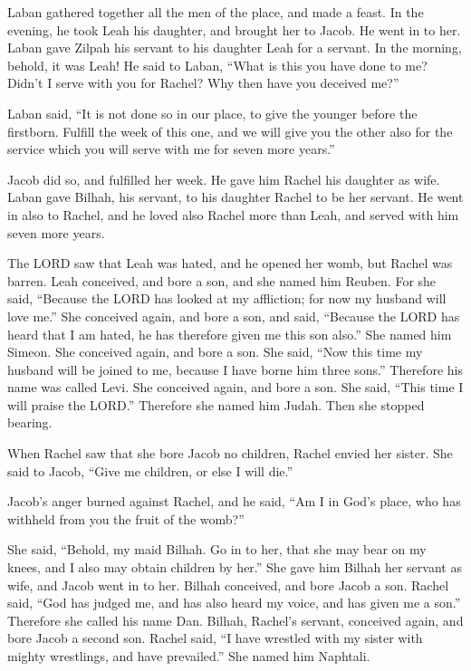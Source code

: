 \myverse{}Laban gathered together all the men of the place, and made a feast.  \myverse{}In the evening, he took Leah his daughter, and brought her to Jacob. He went in to her.  \myverse{}Laban gave Zilpah his servant to his daughter Leah for a servant.  \myverse{}In the morning, behold, it was Leah! He said to Laban, “What is this you have done to me? Didn’t I serve with you for Rachel? Why then have you deceived me?”

\myverse{}Laban said, “It is not done so in our place, to give the younger before the firstborn.  \myverse{}Fulfill the week of this one, and we will give you the other also for the service which you will serve with me for seven more years.”

\myverse{}Jacob did so, and fulfilled her week. He gave him Rachel his daughter as wife.  \myverse{}Laban gave Bilhah, his servant, to his daughter Rachel to be her servant.  \myverse{}He went in also to Rachel, and he loved also Rachel more than Leah, and served with him seven more years.

\myverse{}The LORD saw that Leah was hated, and he opened her womb, but Rachel was barren.  \myverse{}Leah conceived, and bore a son, and she named him Reuben. For she said, “Because the LORD has looked at my affliction; for now my husband will love me.”  \myverse{}She conceived again, and bore a son, and said, “Because the LORD has heard that I am hated, he has therefore given me this son also.” She named him Simeon.  \myverse{}She conceived again, and bore a son. She said, “Now this time my husband will be joined to me, because I have borne him three sons.” Therefore his name was called Levi.   \myverse{}She conceived again, and bore a son. She said, “This time I will praise the LORD.” Therefore she named him Judah. Then she stopped bearing.

\mychapter{}
\myverse*{}When Rachel saw that she bore Jacob no children, Rachel envied her sister. She said to Jacob, “Give me children, or else I will die.”

\myverse{}Jacob’s anger burned against Rachel, and he said, “Am I in God’s place, who has withheld from you the fruit of the womb?”

\myverse{}She said, “Behold, my maid Bilhah. Go in to her, that she may bear on my knees, and I also may obtain children by her.”  \myverse{}She gave him Bilhah her servant as wife, and Jacob went in to her.  \myverse{}Bilhah conceived, and bore Jacob a son.  \myverse{}Rachel said, “God has judged me, and has also heard my voice, and has given me a son.” Therefore she called his name Dan.  \myverse{}Bilhah, Rachel’s servant, conceived again, and bore Jacob a second son.  \myverse{}Rachel said, “I have wrestled with my sister with mighty wrestlings, and have prevailed.” She named him Naphtali.

